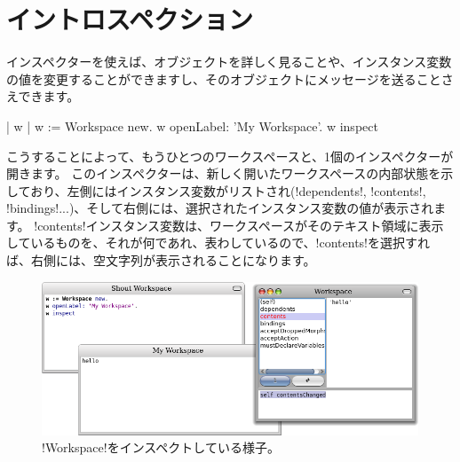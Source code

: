 \documentclass[a4paper,10pt,twoside]{book}
\begin{document}
\section{イントロスペクション}

インスペクターを使えば、オブジェクトを詳しく見ることや、インスタンス変数の値を変更することができますし、そのオブジェクトにメッセージを送ることさえできます。

\begin{code}{| w |}
w := Workspace new.
w openLabel: 'My Workspace'.
w inspect
\end{code}

こうすることによって、もうひとつのワークスペースと、1個のインスペクターが開きます。
このインスペクターは、新しく開いたワークスペースの内部状態を示しており、左側にはインスタンス変数がリストされ(\ct!dependents!, \ct!contents!, \ct!bindings!...)、そして右側には、選択されたインスタンス変数の値が表示されます。
\ct!contents!インスタンス変数は、ワークスペースがそのテキスト領域に表示しているものを、それが何であれ、表わしているので、\ct!contents!を選択すれば、右側には、空文字列が表示されることになります。

\begin{figure}[ht]\centering
	\includegraphics[width=\linewidth]{workspaceInspector}
	\caption{\ct!Workspace!をインスペクトしている様子。}
\end{figure}
\end{document}
